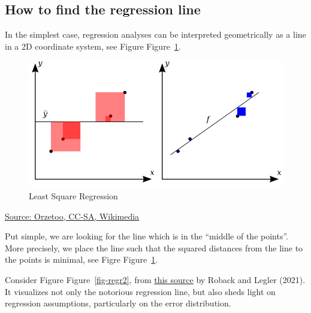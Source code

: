 \documentclass[
  letterpaper,
  DIV=11,
  numbers=noendperiod]{scrreprt}
\theoremstyle{definition}
\theoremstyle{definition}
\theoremstyle{remark}
\begin{document}
\hypertarget{how-to-find-the-regression-line}{%
\subsection{How to find the regression
line}\label{how-to-find-the-regression-line}}

In the simplest case, regression analyses can be interpreted
geometrically as a line in a 2D coordinate system, see Figure
Figure~\ref{fig-regr1}.

\begin{figure}

{\centering \includegraphics{./img/800px-Coefficient_of_Determination.svg.png}

}

\caption{\label{fig-regr1}Least Square Regression}

\end{figure}

\href{https://commons.wikimedia.org/wiki/File:Coefficient_of_Determination.svg}{Source:
Orzetoo, CC-SA, Wikimedia}

Put simple, we are looking for the line which is in the ``middle of the
points''. More precisely, we place the line such that the squared
distances from the line to the points is minimal, see Figre
Figure~\ref{fig-regr1}.

Consider Figure Figure~\ref{fig-regr2}, from
\href{https://bookdown.org/roback/bookdown-BeyondMLR/ch-MLRreview.html\#assumptions-for-linear-least-squares-regression}{this
source} by Roback and Legler (2021). It visualizes not only the
notorious regression line, but also sheds light on regression
assumptions, particularly on the error distribution.
\end{document}
